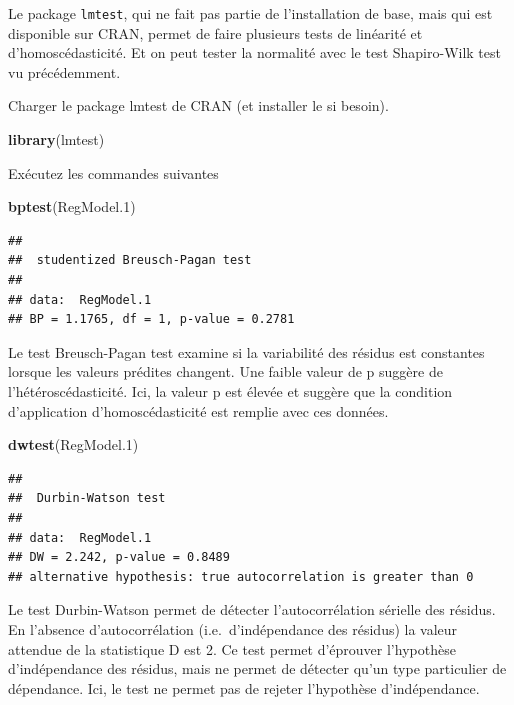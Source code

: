 \documentclass[
  12pt,
]{book}
\makeatletter
\newenvironment{Shaded}{\begin{snugshade}}{\end{snugshade}}
\newcommand{\FloatTok}[1]{\textcolor[rgb]{0.00,0.00,0.81}{#1}}
\newcommand{\KeywordTok}[1]{\textcolor[rgb]{0.13,0.29,0.53}{\textbf{#1}}}
\newcommand{\NormalTok}[1]{#1}
\newenvironment{kframe}{%
\medskip{}
\setlength{\fboxsep}{.8em}
\def\at@end@of@kframe{}%
\ifinner\ifhmode%
 \def\at@end@of@kframe{\end{minipage}}%
 \begin{minipage}{\columnwidth}%
\fi\fi%
\def\FrameCommand##1{\hskip\@totalleftmargin \hskip-\fboxsep
\colorbox{incolor}{##1}\hskip-\fboxsep
    \hskip-\linewidth \hskip-\@totalleftmargin \hskip\columnwidth}%
\MakeFramed {\advance\hsize-\width
  \@totalleftmargin\z@ \linewidth\hsize
  \@setminipage}}%
{\par\unskip\endMakeFramed%
\at@end@of@kframe}
\newenvironment{rmdblock}[1]
 {
 \begin{itemize}
 \renewcommand{\labelitemi}{
   \raisebox{-.7\height}[0pt][0pt]{
     {\setkeys{Gin}{width=3em,keepaspectratio}\texttt{[image: images/\#1]}}
   }
 }
 \begin{kframe}
 \setlength{\fboxsep}{1em}
 \item
 }
 {
 \end{kframe}
 \end{itemize}
 }
\newenvironment{rmdcode}
  {\begin{rmdblock}{screen}}
  {\end{rmdblock}}
\makeatother
\begin{document}
Le package \texttt{lmtest}, qui ne fait pas partie de l'installation de base, mais qui est disponible sur CRAN, permet de faire plusieurs tests de linéarité et d'homoscédasticité. Et on peut tester la normalité avec le test Shapiro-Wilk test vu précédemment.

\begin{rmdcode}
Charger le package lmtest de CRAN (et installer le si besoin).
\end{rmdcode}

\begin{Shaded}
\begin{Highlighting}[]
\KeywordTok{library}\NormalTok{(lmtest)}
\end{Highlighting}
\end{Shaded}

\begin{rmdcode}
Exécutez les commandes suivantes
\end{rmdcode}

\begin{Shaded}
\begin{Highlighting}[]
\KeywordTok{bptest}\NormalTok{(RegModel}\FloatTok{.1}\NormalTok{)}
\end{Highlighting}
\end{Shaded}

\begin{verbatim}
## 
##  studentized Breusch-Pagan test
## 
## data:  RegModel.1
## BP = 1.1765, df = 1, p-value = 0.2781
\end{verbatim}

Le test Breusch-Pagan test examine si la variabilité des résidus est constantes lorsque les valeurs prédites changent. Une faible valeur de p suggère de l'hétéroscédasticité. Ici, la valeur p est élevée et suggère que la condition d'application d'homoscédasticité est remplie avec ces données.

\begin{Shaded}
\begin{Highlighting}[]
\KeywordTok{dwtest}\NormalTok{(RegModel}\FloatTok{.1}\NormalTok{)}
\end{Highlighting}
\end{Shaded}

\begin{verbatim}
## 
##  Durbin-Watson test
## 
## data:  RegModel.1
## DW = 2.242, p-value = 0.8489
## alternative hypothesis: true autocorrelation is greater than 0
\end{verbatim}

Le test Durbin-Watson permet de détecter l'autocorrélation sérielle des résidus. En l'absence d'autocorrélation (i.e.~d'indépendance des résidus) la valeur attendue de la statistique D est 2. Ce test permet d'éprouver l'hypothèse d'indépendance des résidus, mais ne permet de détecter qu'un type particulier de dépendance. Ici, le test ne permet pas de rejeter l'hypothèse d'indépendance.
\end{document}
